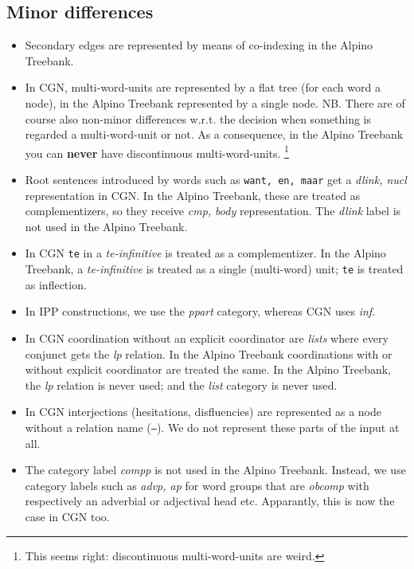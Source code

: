 \documentclass[12pt]{article}
\begin{document}
\subsection*{Minor differences}

\begin{itemize}

\item Secondary edges are represented by means of co-indexing in the
  Alpino Treebank.
  
\item In CGN, multi-word-units are represented by a flat tree (for
  each word a node), in the Alpino Treebank represented by a single
  node. NB. There are of course also non-minor differences w.r.t. the
  decision when something is regarded a multi-word-unit or not. As a
  consequence, in the Alpino Treebank you can {\bf never} have
  discontinuous multi-word-units. \footnote{This seems right:
    discontinuous multi-word-units are weird.}
  
\item Root sentences introduced by words such as {\tt want, en, maar}
  get a {\em dlink, nucl} representation in CGN. In the Alpino
  Treebank, these are treated as complementizers, so they receive {\em
    cmp, body} representation. The {\em dlink} label is not used in
  the Alpino Treebank.
  
\item In CGN {\tt te} in a {\em te-infinitive} is treated as a
  complementizer. In the Alpino Treebank, a {\em te-infinitive} is
  treated as a single (multi-word) unit; {\tt te} is treated as
  inflection.

\item In IPP constructions, we use the {\em ppart} category, whereas
  CGN uses {\em inf}.
  
\item In CGN coordination without an explicit coordinator are {\em
    lists} where every conjunct gets the {\em lp} relation. In the
  Alpino Treebank coordinations with or without explicit coordinator
  are treated the same. In the Alpino Treebank, the {\em lp} relation
  is never used; and the {\em list} category is never used.
  
\item In CGN interjections (hesitations, disfluencies) are represented
  as a node without a relation name ({\tt --}). We do not represent
  these parts of the input at all.

\item The category label {\em compp} is not used in the Alpino
  Treebank. Instead, we use category labels such as {\em advp, ap} for
  word groups that are {\em obcomp} with respectively an adverbial or
  adjectival head etc. Apparantly, this is now the case in CGN too.


\end{itemize}
\end{document}
